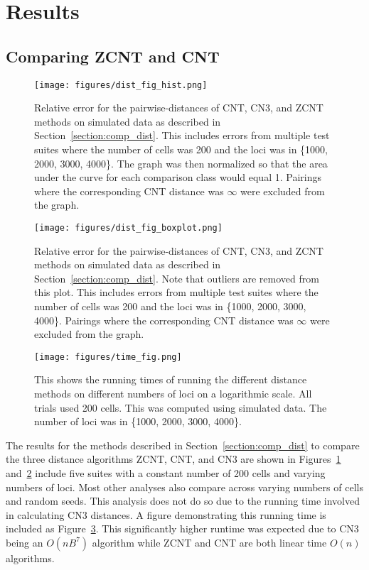 \section{Results}

\subsection{Comparing ZCNT and CNT}\label{section:comp_dist_res}

\begin{figure}[ht]
    \centering
    \texttt{[image: figures/dist\_fig\_hist.png]}
    \caption{Relative error for the pairwise-distances of CNT, CN3, and ZCNT methods on simulated data as described in Section~\ref{section:comp_dist}. This includes errors from multiple test suites where the number of cells was 200 and the loci was in \{1000, 2000, 3000, 4000\}. The graph was then normalized so that the area under the curve for each comparison class would equal 1. Pairings where the corresponding CNT distance was $\infty$ were excluded from the graph.}\label{fig:dist_figure_histogram}
\end{figure}

\begin{figure}[ht]
    \centering
    \texttt{[image: figures/dist\_fig\_boxplot.png]}
    \caption{Relative error for the pairwise-distances of CNT, CN3, and ZCNT methods on simulated data as described in Section~\ref{section:comp_dist}. Note that outliers are removed from this plot. This includes errors from multiple test suites where the number of cells was 200 and the loci was in \{1000, 2000, 3000, 4000\}. Pairings where the corresponding CNT distance was $\infty$ were excluded from the graph.}\label{fig:dist_fig_box}
\end{figure}

\begin{figure}[ht]
    \centering 
    \texttt{[image: figures/time\_fig.png]}
    \caption{This shows the running times of running the different distance methods on different numbers of loci on a logarithmic scale. All trials used 200 cells. This was computed using simulated data. The number of loci was in \{1000, 2000, 3000, 4000\}.}\label{fig:time_fig}
\end{figure} 

The results for the methods described in Section~\ref{section:comp_dist} to compare the three distance algorithms ZCNT, CNT, and CN3 are shown in Figures~\ref{fig:dist_figure_histogram} and~\ref{fig:dist_fig_box} include five suites with a constant number of 200 cells and varying numbers of loci. Most other analyses also compare across varying numbers of cells and random seeds. This analysis does not do so due to the running time involved in calculating CN3 distances. A figure demonstrating this running time is included as Figure~\ref{fig:time_fig}. This significantly higher runtime was expected due to CN3 being an $O(nB^7)$ algorithm while ZCNT and CNT are both linear time $O(n)$ algorithms. 

